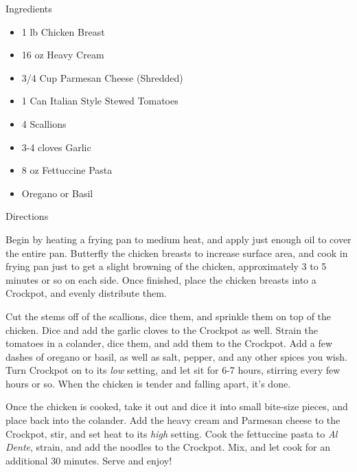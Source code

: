Ingredients

\begin{itemize}
	\item 1 lb Chicken Breast
	\item 16 oz Heavy Cream
	\item 3/4 Cup Parmesan Cheese (Shredded)
	\item 1 Can Italian Style Stewed Tomatoes
	\item 4 Scallions
	\item 3-4 cloves Garlic
	\item 8 oz Fettuccine Pasta
	\item Oregano or Basil
\end{itemize}

\noindent
Directions
\newline

Begin by heating a frying pan to medium heat, and apply just enough oil to cover the entire pan. Butterfly the chicken breasts to increase surface area, and cook in frying pan just to get a slight browning of the chicken, approximately 3 to 5 minutes or so on each side. Once finished, place the chicken breasts into a Crockpot, and evenly distribute them.

Cut the stems off of the scallions, dice them, and sprinkle them on top of the chicken. Dice and add the garlic cloves to the Crockpot as well. Strain the tomatoes in a colander, dice them, and add them to the Crockpot. Add a few dashes of oregano or basil, as well as salt, pepper, and any other spices you wish. Turn Crockpot on to its \textit{low} setting, and let sit for 6-7 hours, stirring every few hours or so. When the chicken is tender and falling apart, it's done.

Once the chicken is cooked, take it out and dice it into small bite-size pieces, and place back into the colander. Add the heavy cream and Parmesan cheese to the Crockpot, stir, and set heat to its \textit{high} setting. Cook the fettuccine pasta to \textit{Al Dente}, strain, and add the noodles to the Crockpot. Mix, and let cook for an additional 30 minutes. Serve and enjoy!